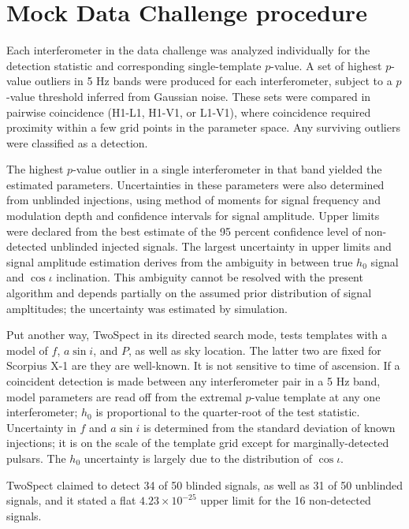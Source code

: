 \section{Mock Data Challenge procedure}

Each interferometer in the data challenge was analyzed individually for 
the detection statistic and corresponding single-template $p$-value. A set
of highest $p$-value outliers in 5 Hz bands were produced for each 
interferometer, subject to a $p$-value threshold inferred from Gaussian noise.
These sets were compared in pairwise coincidence (H1-L1, H1-V1, or L1-V1),
where coincidence required proximity within a few grid points in the 
parameter space. Any surviving outliers were classified as a detection. 

The highest $p$-value outlier in a single interferometer in that band 
yielded the estimated parameters. Uncertainties in these parameters were also
determined from unblinded injections, using method of moments for signal
frequency and modulation depth and confidence intervals for signal
amplitude. Upper limits were declared from the best estimate of the 95
percent confidence level of non-detected unblinded injected signals. The
largest uncertainty in upper limits and signal amplitude estimation derives
from the ambiguity in between true $h_0$ signal and $\cos \iota$ inclination.
This ambiguity cannot be resolved with the present algorithm and depends
partially on the assumed prior distribution of signal ampltitudes; the
uncertainty was estimated by simulation.

Put another way, TwoSpect
in its directed search mode, tests templates with a model of
$f$, $a \sin i$, and $P$, as well as sky location. The latter two are
fixed for Scorpius X-1 are they are well-known. 
It is not sensitive to time of ascension.
If a coincident detection is made between any interferometer pair in a 5 Hz band,
model parameters are read off from the extremal $p$-value template at
any one interferometer; $h_0$ is proportional to the quarter-root of
the test statistic. Uncertainty in $f$ and $a \sin i$ is determined
from the standard deviation of known injections; it is on the scale
of the template grid except for marginally-detected pulsars. The $h_0$ 
uncertainty is largely due to the distribution of $\cos \iota$. 

TwoSpect claimed to detect 34 of 50 blinded signals, as well as 31 of 50 unblinded signals, and it stated a flat
$4.23 \times 10^{-25}$ upper limit for the 16 non-detected signals. 

